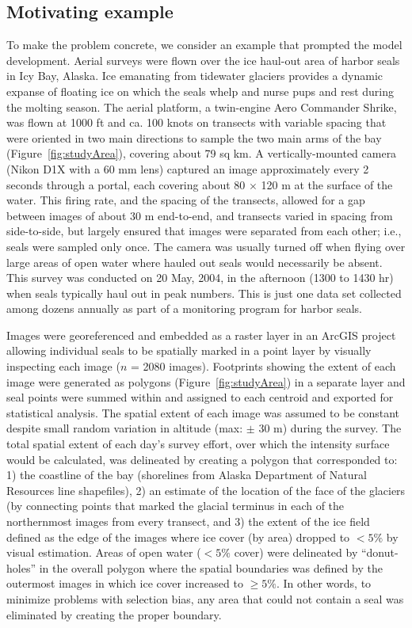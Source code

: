\documentclass[12pt, titlepage]{article}\usepackage[]{graphicx}\usepackage[]{color}
\begin{document}
\subsection{Motivating example}\label{sec:motivate}



To make the problem concrete, we consider an example that prompted the model development. Aerial surveys were flown over the ice haul-out area of harbor seals in Icy Bay, Alaska.  Ice emanating from tidewater glaciers provides a dynamic expanse of floating ice on which the seals whelp and nurse pups and rest during the molting season.  The aerial platform, a twin-engine Aero Commander Shrike, was flown at 1000 ft and ca. 100 knots on transects with variable spacing that were oriented in two main directions to sample the two main arms of the bay (Figure~\ref{fig:studyArea}), covering about 79 sq km.  A vertically-mounted camera (Nikon D1X with a 60 mm lens) captured an image approximately every 2 seconds through a portal, each covering about 80 $\times$ 120 m at the surface of the water. This firing rate, and the spacing of the transects, allowed for a gap between images of about 30 m end-to-end, and transects varied in spacing from side-to-side, but largely ensured that images were separated from each other; i.e., seals were sampled only once.  The camera was usually turned off when flying over large areas of open water where hauled out seals would necessarily be absent.  This survey was conducted on 20 May, 2004, in the afternoon (1300 to 1430 hr) when seals typically haul out in peak numbers. This is just one data set collected among dozens annually as part of a monitoring program for harbor seals.

Images were georeferenced and embedded as a raster layer in an ArcGIS \citep*{ESRI:ArcG:2009} project allowing individual seals to be spatially marked in a point layer by visually inspecting each image ($n$ = 2080 images).  Footprints showing the extent of each image were generated as polygons (Figure~\ref{fig:studyArea}) in a separate layer and seal points were summed within and assigned to each centroid and exported for statistical analysis.  The spatial extent of each image was assumed to be constant despite small random variation in altitude (max: $\pm$ 30 m) during the survey.  The total spatial extent of each day’s survey effort, over which the intensity surface would be calculated, was delineated by creating a polygon that corresponded to: 1) the coastline of the bay (shorelines from Alaska Department of Natural Resources line shapefiles), 2) an estimate of the location of the face of the glaciers (by connecting points that marked the glacial terminus in each of the northernmost images from every transect, and 3) the extent of the ice field defined as the edge of the images where ice cover (by area) dropped to $<5\%$ by visual estimation.  Areas of open water ($<5\%$ cover) were delineated by “donut-holes” in the overall polygon where the spatial boundaries was defined by the outermost images in which ice cover increased to $ \geq 5\%$.  In other words, to minimize problems with selection bias, any area that could not contain a seal was eliminated by creating the proper boundary.
\end{document}
